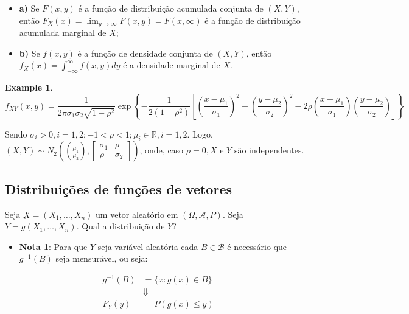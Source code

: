 \documentclass[
]{article}
\providecommand{\tightlist}{%
  \setlength{\itemsep}{0pt}\setlength{\parskip}{0pt}}
\theoremstyle{definition}
\theoremstyle{definition}
\newtheorem{example}{Example}[section]
\theoremstyle{definition}
\theoremstyle{definition}
\theoremstyle{remark}
\begin{document}
\begin{itemize}
\tightlist
\item
  \textbf{a)} Se \(F(x,y)\) é a função de distribuição acumulada conjunta de \((X,Y)\), então \(F_{X}(x) = \lim_{y \to \infty}F(x,y) = F(x,\infty)\) é a função de distribuição acumulada marginal de \(X\);
\item
  \textbf{b)} Se \(f(x,y)\) é a função de densidade conjunta de \((X,Y)\), então \(f_{X}(x) = \int_{-\infty}^{\infty}f(x,y)dy\) é a densidade marginal de \(X\).
\end{itemize}

\begin{example}
\begin{equation*}
f_{XY}(x,y) = \frac{1}{2\pi \sigma_{1}\sigma_{2}\sqrt{1-\rho^{2}}}\exp\left\{-\frac{1}{2(1-\rho^{2})}\left[\left(\frac{x-\mu_{1}}{\sigma_{1}}\right)^{2} + \left(\frac{y-\mu_{2}}{\sigma_{2}}\right)^{2} - 2\rho \left(\frac{x-\mu_{1}}{\sigma_{1}}\right)\left(\frac{y-\mu_{2}}{\sigma_{2}}\right)\right]\right\}
\end{equation*}

Sendo \(\sigma_{i} > 0, i = 1,2; -1 < \rho < 1; \mu_{i} \in \mathbb{R}, i = 1,2\). Logo, \((X,Y) \sim N_{2}\left(\binom{\mu_{1}}{\mu_{2}},\begin{bmatrix}\sigma_{1} & \rho \\ \rho & \sigma_{2}\end{bmatrix}\right)\), onde, caso \(\rho = 0, X\) e \(Y\) são independentes.
\end{example}

\hypertarget{distribuiuxe7uxf5es-de-funuxe7uxf5es-de-vetores}{%
\subsection{Distribuições de funções de vetores}\label{distribuiuxe7uxf5es-de-funuxe7uxf5es-de-vetores}}

Seja \(\underbar{X} = (X_{1},\ldots,X_{n})\) um vetor aleatório em \((\Omega, \mathcal{A},P)\). Seja \(Y = g(X_{1},\ldots,X_{n})\). Qual a distribuição de \(Y\)?

\begin{itemize}
\tightlist
\item
  \textbf{Nota 1}: Para que \(Y\) seja variável aleatória cada \(B \in \mathcal{B}\) é necessário que \(g^{-1}(B)\) seja mensurável, ou seja:
\end{itemize}

\begin{align*}
g^{-1}(B) &= \{x:g(x) \in B\} \\
&\Downarrow \\
F_{Y}(y) &= P(g(x) \le y)
\end{align*}
\end{document}
